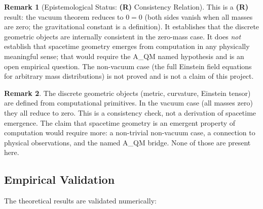 \documentclass[11pt, a4paper]{report}
\theoremstyle{definition}
\newtheorem{remark}{Remark}[chapter]
\theoremstyle{plain}
\begin{document}
\begin{remark}[Epistemological Status: \textbf{(R)} Consistency Relation]
This is a \textbf{(R)} result: the vacuum theorem reduces to $0 = 0$ (both sides vanish when all masses are zero; the gravitational constant is a definition). It establishes that the discrete geometric objects are internally consistent in the zero-mass case. It does \emph{not} establish that spacetime geometry emerges from computation in any physically meaningful sense; that would require the A\_QM named hypothesis and is an open empirical question. The non-vacuum case (the full Einstein field equations for arbitrary mass distributions) is not proved and is not a claim of this project.
\end{remark}

\begin{remark}
The discrete geometric objects (metric, curvature, Einstein tensor) are defined from computational primitives. In the vacuum case (all masses zero) they all reduce to zero. This is a consistency check, not a derivation of spacetime emergence. The claim that spacetime geometry is an emergent property of computation would require more: a non-trivial non-vacuum case, a connection to physical observations, and the named A\_QM bridge. None of those are present here.
\end{remark}

\subsection{Empirical Validation}

The theoretical results are validated numerically:
\end{document}
